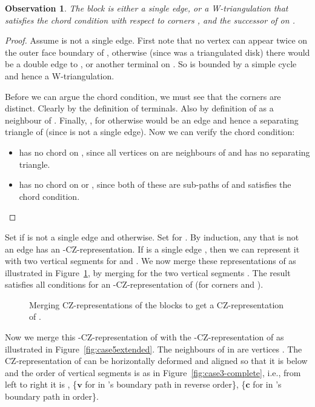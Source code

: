 \documentclass{article}
\renewcommand{\int}[1]{}
\newcommand{\bb}[1]{\ensuremath{\mathbf{#1}}}
\newtheorem{observation}[theorem]{Observation}
\begin{document}
\begin{observation}
\label{obs:chain-block}
The  block  is either a single edge, or a W-triangulation
that satisfies the chord condition with respect to corners
, and  the successor of  on .
\end{observation}
\begin{proof}
Assume  is not a single edge.  First note that no vertex can appear twice
on the outer face boundary of , otherwise (since  was a triangulated disk)
there would be a double edge to , or another terminal on .
So  is bounded by a simple cycle and hence a W-triangulation.

Before we can argue the chord condition, we must see that the corners are
distinct.  Clearly  by the definition of terminals.
Also  by definition of  as a neighbour of .  
Finally, , for otherwise  would be an
edge and  hence a separating triangle of  (since
 is not a single edge).  Now we can verify the chord condition:
\begin{itemize}
\item  has no chord on , since all vertices on  are 
	neighbours of  and  has no separating triangle.  
\item  has no chord on  or , since both of
	these are sub-paths of  and  satisfies the chord
	condition.
\end{itemize}
\end{proof}

Set  if  is not a single edge and  otherwise.
Set  for .  By induction, any 
that is not an edge has an \int{F_i}-CZ-representation.
If  is a single edge , then we can represent it with two
vertical segments for  and .  We now merge these representations
of  as illustrated in Figure~\ref{fig:chain-representation},
by merging for  the two vertical segments .
The result satisfies all conditions for an 
\int{F_1}-CZ-representation 
of  (for corners  and ).


\begin{figure}
    \centering
{}
\raisebox{-0.5\height}{~~~~~~}
    \caption{Merging CZ-representations of the blocks to get a CZ-representation
of .}
    \label{fig:chain-representation}
\end{figure}

Now we merge this \int{F_1}-CZ-representation of  with the 
\int{(u_1,u_2)}-CZ-representation of  as illustrated in
Figure~\ref{fig:case5extended}.
The neighbours of  in  are vertices . 
The CZ-representation of  can be horizontally deformed and aligned so that 
it is below  and the order of vertical segments is as in 
Figure~\ref{fig:case3-complete},
i.e., from left to right it is , 
\{\bb{v} for  in 's boundary path
 in reverse  order\},
\{\bb{c} for  in 's boundary path
 in order\}.
\end{document}
